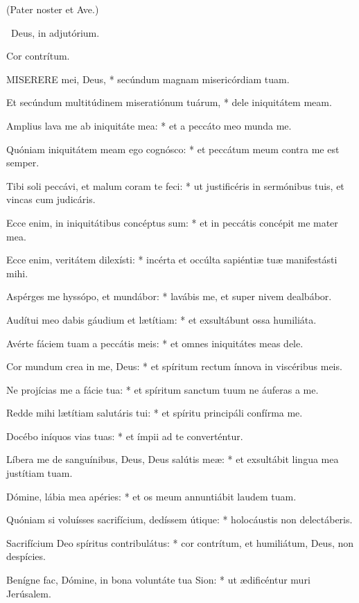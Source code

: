 
(Pater noster et Ave.)

\V\ Deus, in adjutórium.

 Cor contrítum.


\lettrine[lines=2]{M}{ISERERE} mei, Deus, * secúndum magnam misericórdiam tuam.

Et secúndum multitúdinem miseratiónum tuárum, * dele iniquitátem meam.

Amplius lava me ab iniquitáte mea: * et a peccáto meo munda me.

Quóniam iniquitátem meam ego cognósco: * et peccátum meum contra me est semper.

Tibi soli peccávi, et malum coram te feci: * ut justificéris in sermónibus tuis, et vincas cum judicáris.

Ecce enim, in iniquitátibus concéptus sum: * et in peccátis concépit me mater mea.

Ecce enim, veritátem dilexísti: * incérta et occúlta sapiéntiæ tuæ manifestásti mihi.

Aspérges me hyssópo, et mundábor: * lavábis me, et super nivem dealbábor.

Audítui meo dabis gáudium et lætítiam: * et exsultábunt ossa humiliáta.

Avérte fáciem tuam a peccátis meis: * et omnes iniquitátes meas dele.

Cor mundum crea in me, Deus: * et spíritum rectum ínnova in viscéribus meis.

Ne projícias me a fácie tua: * et spíritum sanctum tuum ne áuferas a me.

Redde mihi lætítiam salutáris tui: * et spíritu principáli confírma me.

Docébo iníquos vias tuas: * et ímpii ad te converténtur.

Líbera me de sanguínibus, Deus, Deus salútis meæ: * et exsultábit lingua mea justítiam tuam.

Dómine, lábia mea apéries: * et os meum annuntiábit laudem tuam.

Quóniam si voluísses sacrifícium, dedíssem útique: * holocáustis non delectáberis.

Sacrifícium Deo spíritus contribulátus: * cor contrítum, et humiliátum, Deus, non despícies.

Benígne fac, Dómine, in bona voluntáte tua Sion: * ut ædificéntur muri Jerúsalem.

